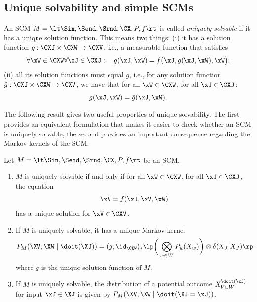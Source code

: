 \subsection{Unique solvability and simple SCMs}

\begin{Def}\label{def:scm_unique_solvability}
  An SCM $M = \lt \Sin, \Send, \Srnd, \CX, P, f \rt$ is called \emph{uniquely solvable} if it has a unique solution function. This means two things: (i) it has a solution function $g : \CXJ \times \CXW \to \CXV$, i.e., a measurable function
  that satisfies
  \begin{equation}\label{eq:scm_unique_solvability}
    \forall \xW\in\CXW \forall \xJ\in\CXJ: \quad g(\xJ,\xW) = f\big(\xJ, g(\xJ,\xW), \xW\big);
  \end{equation}
  (ii) all its solution functions must equal $g$, i.e., for any solution function $\tilde{g} : \CXJ \times \CXW \to \CXV$,
  we have that for all $\xW\in\CXW$, for all $\xJ\in\CXJ$:
  $$g(\xJ,\xW) = \tilde{g}(\xJ,\xW).$$
\end{Def}
The following result gives two useful properties of unique solvability. 
The first provides an equivalent formulation that makes it easier to check whether an SCM
is uniquely solvable, the second provides an important consequence regarding
the Markov kernels of the SCM.
\begin{Thm}\label{thm:scm_unique_solvability}
  Let $M = \lt \Sin, \Send, \Srnd, \CX, P, f \rt$ be an SCM.
  \begin{enumerate}
    \item $M$ is uniquely solvable if and only if 
      for all $\xW\in\CXW$, for all $\xJ \in \CXJ$, the equation
      $$\xV = f(\xJ,\xV,\xW)$$
      has a unique solution for $\xV\in\CXV$.
    \item If $M$ is uniquely solvable, it has a unique Markov kernel 
      $$P_{M}(\XV,\XW \mid\doit(\XJ)) = (g,\id_{\CXW})_* \lp \bigg( \bigotimes_{w\in W} P_w(X_w) \bigg) \otimes \delta(X_J|X_J) \rp $$
      where $g$ is the unique solution function of $M$.
    \item If $M$ is uniquely solvable, the distribution of a potential outcome $X^{\doit(\xJ)}_{V\cup W}$ for input $\xJ\in\XJ$ is given by $P_{M}(\XV,\XW \mid \doit(\XJ=\xJ))$.
  \end{enumerate}
\end{Thm}
